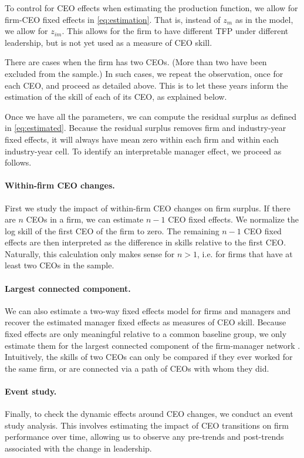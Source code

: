 \documentclass[11pt,a4paper]{article}
\begin{document}
To control for CEO effects when estimating the production function, we allow for firm-CEO fixed effects in \eqref{eq:estimation}. That is, instead of $z_m$ as in the model, we allow for $z_{im}$. This allows for the firm to have different TFP under different leadership, but is not yet used as a measure of CEO skill. 

There are cases when the firm has two CEOs. (More than two have been excluded from the sample.) In such cases, we repeat the observation, once for each CEO, and proceed as detailed above. This is to let these years inform the estimation of the skill of each of its CEO, as explained below.

Once we have all the parameters, we can compute the residual surplus as defined in \eqref{eq:estimated}. Because the residual surplus removes firm and industry-year fixed effects, it will always have mean zero within each firm and within each industry-year cell. To identify an interpretable manager effect, we proceed as follows.

\paragraph{Within-firm CEO changes.}
First we study the impact of within-firm CEO changes on firm surplus. If there are $n$ CEOs in a firm, we can estimate $n-1$ CEO fixed effects. We normalize the log skill of the first CEO of the firm to zero. The remaining $n-1$ CEO fixed effects are then interpreted as the difference in skills relative to the first CEO. Naturally, this calculation only makes sense for $n>1$, i.e. for firms that have at least two CEOs in the sample.

\paragraph{Largest connected component.}
We can also estimate a two-way fixed effects model for firms and managers \citep{Abowd1999Econometrica,Card2018JoLE,reghdfe} and recover the estimated manager fixed effects as measures of CEO skill. Because fixed effects are only meaningful relative to a common baseline group, we only estimate them for the largest connected component of the firm-manager network \citep{Bonhomme2023-dx}. Intuitively, the skills of two CEOs can only be compared if they ever worked for the same firm, or are connected via a path of CEOs with whom they did.

\paragraph{Event study.}
Finally, to check the dynamic effects around CEO changes, we conduct an event study analysis. This involves estimating the impact of CEO transitions on firm performance over time, allowing us to observe any pre-trends and post-trends associated with the change in leadership. 
\end{document}
